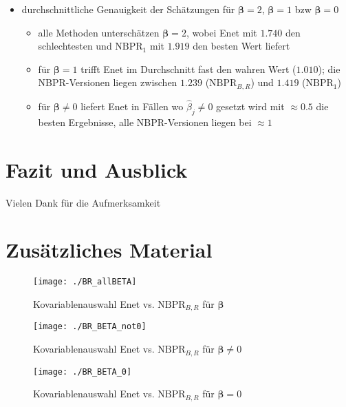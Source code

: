 \documentclass{beamer}
\begin{document}
\begin{frame}
	\begin{itemize}
	\item durchschnittliche Genauigkeit der Schätzungen für $\boldsymbol{\beta} = 2$, $\boldsymbol{\beta} = 1$ bzw $\boldsymbol{\beta} = 0$
	\begin{itemize}
	\item alle Methoden unterschätzen $\boldsymbol{\beta}=2$, wobei Enet mit $1.740$ den schlechtesten und $\text{NBPR}_1$ mit $1.919$ den besten Wert liefert
	\item für $\boldsymbol{\beta} = 1$ trifft Enet im Durchschnitt fast den wahren Wert ($1.010$); die NBPR-Versionen liegen zwischen $1.239$ ($\text{NBPR}_{B,R}$) und $1.419$ ($\text{NBPR}_1$)  
	\item für $\boldsymbol{\beta}\neq 0$ liefert Enet in Fällen wo $\hat{\beta}_j \neq 0$ gesetzt wird mit $\approx0.5$ die besten Ergebnisse, alle NBPR-Versionen liegen bei $\approx 1$
	\end{itemize}
	\end{itemize}
\end{frame}


\section{Fazit und Ausblick}
\begin{frame}

\end{frame}


\begin{frame}
Vielen Dank für die Aufmerksamkeit
\end{frame}


\section{Zusätzliches Material}
\begin{frame}
	\begin{figure}
	\centering
	\texttt{[image: ./BR\_allBETA]}
	\caption{Kovariablenauswahl Enet vs. $\text{NBPR}_{B,R}$ für $\boldsymbol{\beta}$}
	\label{fig:a}
	\end{figure}
\end{frame}
\begin{frame}
	\begin{figure}
	\centering
	\texttt{[image: ./BR\_BETA\_not0]}
	\caption{Kovariablenauswahl Enet vs. $\text{NBPR}_{B,R}$ für $\boldsymbol{\beta} \neq 0$}
	\label{fig:b}
	\end{figure}
\end{frame}
\begin{frame}
	\begin{figure}
	\centering
	\texttt{[image: ./BR\_BETA\_0]}
	\caption{Kovariablenauswahl Enet vs. $\text{NBPR}_{B,R}$ für $\boldsymbol{\beta} = 0$}
	\label{fig:c}
	\end{figure}
\end{frame}
\end{document}
